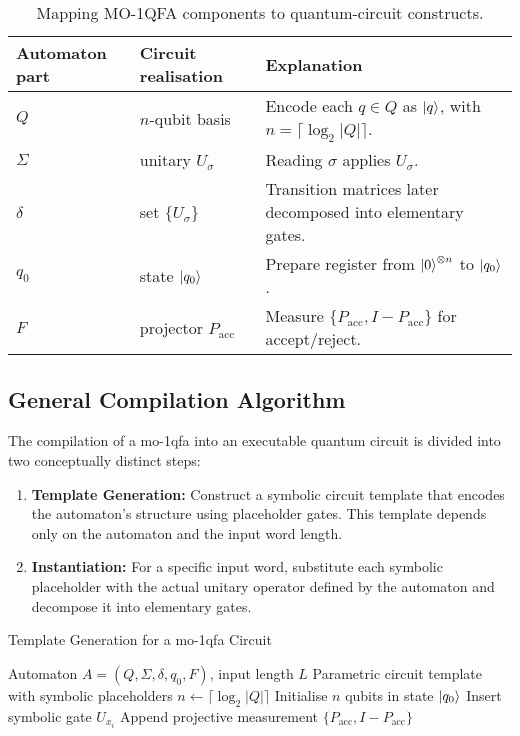 \vspace{6pt}
\begin{table}[ht]
\centering
\footnotesize
\begin{tabularx}{\textwidth}{>{\raggedright\arraybackslash}p{}%
                        >{\raggedright\arraybackslash}p{}X}
\toprule
\textbf{Automaton part} & \textbf{Circuit realisation} & \textbf{Explanation}\\
\midrule
$Q$          & $n$-qubit basis        & Encode each $q\in Q$ as $\ket{q}$, with $n=\lceil\log_2|Q|\rceil$.\\
$\Sigma$     & unitary $U_\sigma$     & Reading $\sigma$ applies $U_\sigma$.\\
$\delta$     & set $\{U_\sigma\}$     & Transition matrices later decomposed into elementary gates.\\
$q_0$        & state $\ket{q_0}$      & Prepare register from $\ket{0}^{\otimes n}$ to $\ket{q_0}$.\\
$F$          & projector $P_{\text{acc}}$ & Measure $\{P_{\text{acc}},I-P_{\text{acc}}\}$ for accept/reject.\\
\bottomrule
\end{tabularx}
\caption{Mapping MO-1QFA components to quantum-circuit constructs.}
\label{tab:moqfa-mapping-new}
\end{table}


\subsection{General Compilation Algorithm}

The compilation of a \gls{mo-1qfa} into an executable quantum circuit is divided into two conceptually distinct steps:
\begin{enumerate}
    \item \textbf{Template Generation:} Construct a symbolic circuit template that encodes the automaton's structure using placeholder gates. This template depends only on the automaton and the input word length.
    \item \textbf{Instantiation:} For a specific input word, substitute each symbolic placeholder with the actual unitary operator defined by the automaton and decompose it into elementary gates.
\end{enumerate}

\begin{algorithm}[H]
\caption{Template Generation for a \gls{mo-1qfa} Circuit}
\label{alg:mo-compiler}
\begin{algorithmic}[1]
\Require Automaton $A=(Q,\Sigma,\delta,q_0,F)$,\; input length $L$
\Ensure Parametric circuit template with symbolic placeholders
\State $n \gets \lceil\log_2 |Q|\rceil$
\State Initialise $n$ qubits in state $\ket{q_0}$
  \State Insert symbolic gate $\boxed{U_{x_i}}$
\EndFor
\State Append projective measurement $\{P_{\text{acc}}, I - P_{\text{acc}}\}$
\end{algorithmic}
\end{algorithm}

